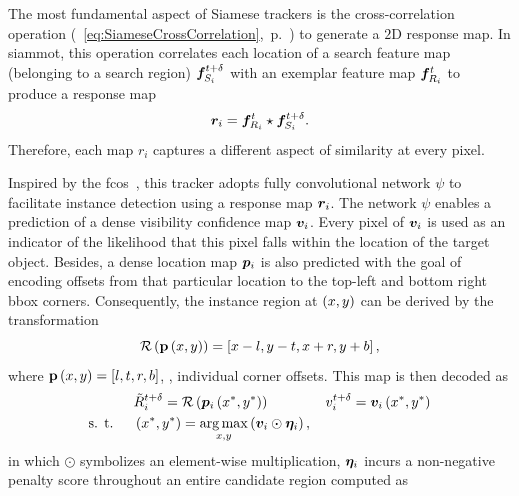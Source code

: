 The most fundamental aspect of Siamese trackers is the cross-correlation operation (\sectiontext{}~\ref{eq:SiameseCrossCorrelation},~p.~\pageref{eq:SiameseCrossCorrelation}) to generate a $2$D response map. In \gls{siammot}, this operation correlates each location of a search feature map (belonging to a search region) $\bm{f}_{S_i}^{t + \delta}$ with an exemplar feature map $\bm{f}_{R_i}^{t}$ to produce a response map
\begin{equation}
    \bm{r}_{i} = \bm{f}_{R_i}^{t} \star \bm{f}_{S_i}^{t + \delta}.
\end{equation}
Therefore, each map $r_i$ captures a different aspect of similarity at every pixel.

Inspired by the \gls{fcos}~\cite{tian2019fcos}, this tracker adopts fully convolutional network $\psi$ to facilitate instance detection using a response map $\bm{r}_{i}$. The network $\psi$ enables a prediction of a dense visibility confidence map $\bm{v}_{i}$. Every pixel of $\bm{v}_{i}$ is used as an indicator of the likelihood that this pixel falls within the location of the target object. Besides, a dense location map $\bm{p}_{i}$ is also predicted with the goal of encoding offsets from that particular location to the top-left and bottom right \gls{bbox} corners. Consequently, the instance region at $\left( {x, y} \right)$ can be derived by the transformation
\begin{equation}
    {\mathcal{R}} \left( {\mathbf{p}} \left( x, y \right) \right) =
    \left[ {x - l, y - t, x + r, y + b} \right],
\end{equation}
where ${\mathbf{p}} \left( x, y \right) = \left[ {l, t, r, b} \right]$, \ietext{}, individual corner offsets. This map is then decoded as
\begin{equation}
    \begin{aligned}
                            & {\tilde{R}}_{i}^{t + \delta} =
        {\mathcal{R}} \left( {\bm{p}_{i}} \left( x^*, y^* \right) \right)                                                                      \qquad \qquad
        {v}_{i}^{t + \delta} = {\bm{v}_{i}} \left( x^*, y^* \right)                                                              \\
        \text{s. t. } \quad & \left( {x^*, y^*} \right) = \underset{x, y}{\operatorname*{arg\,max}} \left( {\bm{v}_{i} \odot \bm{\eta}_{i}} \right),
    \end{aligned}
\end{equation}
in which $\odot$ symbolizes an element-wise multiplication, $\bm{\eta}_{i}$ incurs a non-negative penalty score throughout an entire candidate region computed as
